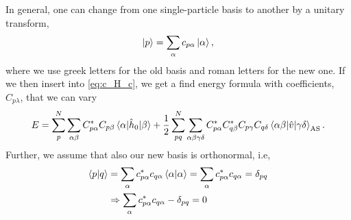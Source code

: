 In general, one can change from one single-particle basis to another by a unitary transform,
\begin{equation}
\ket{p}=\sum_{\alpha}c_{p\alpha}\ket{\alpha},
\end{equation}
where we use greek letters for the old basis and roman letters for the new one. If we then insert into \eqref{eq:c_H_c}, we get a find energy formula with coefficients, $C_{p\lambda}$, that we can vary
\begin{equation}
E=\sum_{p}^N\sum_{\alpha\beta}C_{p\alpha}^*C_{p\beta}\mel{\alpha}{\hat{h}_0}{\beta}+\frac{1}{2}
\sum_{pq}^N\sum_{\alpha\beta\gamma\delta}C_{p\alpha}^*C_{q\beta}^*C_{p\gamma}C_{q\delta}\mel{\alpha\beta}{\hat{v}}{\gamma\delta}_{\text{AS}}.
\end{equation}
Further, we assume that also our new basis is orthonormal, i.e,
\begin{align}
\braket{p}{q}&=\sum_{\alpha}c_{p\alpha}^*c_{q\alpha}\braket{\alpha}{\alpha}=\sum_{\alpha}c_{p\alpha}^*c_{q\alpha}=\delta_{pq}\\
&\Rightarrow\sum_{\alpha}c_{p\alpha}^*c_{q\alpha}-\delta_{pq}=0\label{eq:constraint}
\end{align}

